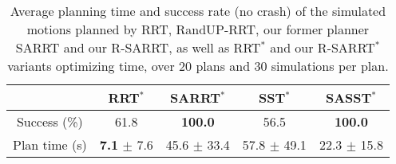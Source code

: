 \begin{table*}[t]
    \centering
    \begin{tabular}{l|llll|}
    \cline{2-5}
        & \multicolumn{1}{c|}{RRT$^{*}$} & \multicolumn{1}{c|}{SARRT$^*$} & \multicolumn{1}{c|}{SST$^*$} & \multicolumn{1}{c|}{SASST$^*$} \\ \hline
    \multicolumn{1}{|c|}{Success (\%)} & \multicolumn{1}{c|}{61.8} & \multicolumn{1}{c|}{\textbf{100.0}}  & \multicolumn{1}{c|}{56.5}  &  \multicolumn{1}{c|}{\textbf{100.0}}   \\ \hline
    \multicolumn{1}{|c|}{Plan time (s)} & \multicolumn{1}{c|}{\textbf{7.1} $\pm$ 7.6}   & \multicolumn{1}{c|}{45.6 $\pm$ 33.4} & \multicolumn{1}{c|}{57.8 $\pm$ 49.1}  &   \multicolumn{1}{c|}{ 22.3 $\pm$ 15.8}  \\ \hline
    \end{tabular}
    \caption{
    \label{tab:samp_unicycle}
    Average planning time and success rate (no crash) of the simulated motions planned by RRT, RandUP-RRT, our former planner SARRT and our R-SARRT, as well as RRT$^{*}$ and our  R-SARRT$^{*}$ variants optimizing time, over 20 plans and 30 simulations per plan.}
\end{table*}
